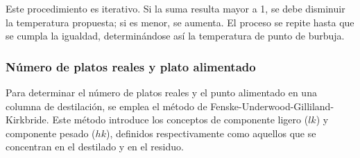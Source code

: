 Este procedimiento es iterativo. Si la suma resulta mayor a 1, se debe disminuir la temperatura propuesta; si es menor, se aumenta. El proceso se repite hasta que se cumpla la igualdad, determinándose así la temperatura de punto de burbuja.

\newpage
\subsubsection{Número de platos reales y plato alimentado}\label{ss_sec:platos_equilibrio_alimentacion}
Para determinar el número de platos reales y el punto alimentado en una columna de destilación, se emplea el método de Fenske-Underwood-Gilliland-Kirkbride. Este método introduce los conceptos de componente ligero ($lk$) y componente pesado ($hk$), definidos respectivamente como aquellos que se concentran en el destilado y en el residuo.


